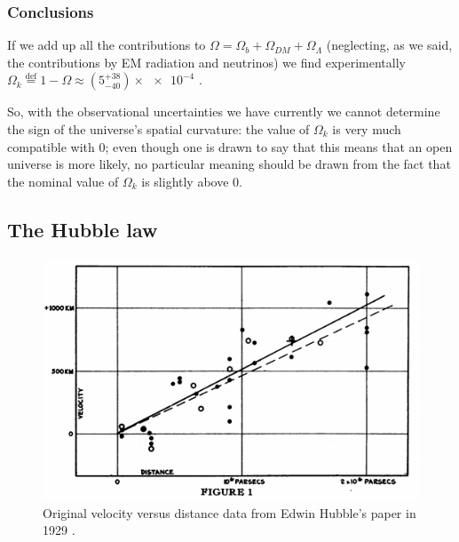 \documentclass[main.tex]{subfiles}
\begin{document}
\subsubsection{Conclusions} \label{sec:global-omega-contributions}

If we add up all the contributions to  \(\Omega = \Omega_b + \Omega_{DM} + \Omega_{\Lambda }\) (neglecting, as we said, the contributions by EM radiation and neutrinos) we find experimentally \(\Omega_{k} \overset{\text{def}}{=} 1- \Omega  \approx (5^{+38}_{-40}) \times  \num{e-4}\) \cite[Table A.2]{planckcollaborationPlanck2018Results2019a}.

So, with the observational uncertainties we have currently we cannot determine the sign of the universe's spatial curvature: the value of \(\Omega_{k}\) is very much compatible with \(0 \); even though one is drawn to say that this means that an open universe is more likely, no particular meaning should be drawn from the fact that the nominal value of \(\Omega_{k}\) is slightly above 0.

\subsection{The Hubble law}

\begin{figure}[ht]
\centering
\includegraphics[width=\textwidth]{figures/hubble_original.png}
\caption{Original velocity versus distance data from Edwin Hubble's paper in 1929 \cite{hubbleedwinRelationDistanceRadial1929}.}
\label{fig:hubble_original}
\end{figure}
\end{document}

